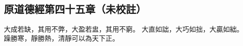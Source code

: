 ﻿%
%

\chapter{~}

\section{原道德經第四十五章（未校註）}

\begin{withgezhu}

\zhsong


大成若缺，其用不弊，大盈若\textcolor{tongjia-color}{盅}，其用不窮。
大直如詘，大巧如拙，\textcolor{tongjia-color}{大贏如絀}。
躁勝寒，靜勝熱，清靜可以為天下正。

\end{withgezhu}
